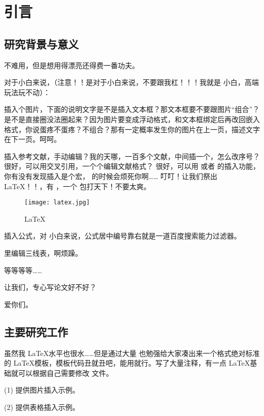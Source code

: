 \section{引言}
\subsection{研究背景与意义}

 不难用，但是想用得漂亮还得费一番功夫。

对于小白来说，（注意！！是对于小白来说，不要跟我杠！！！我就是  小白，高端玩法玩不动）：

插入个图片，下面的说明文字是不是插入文本框？那文本框要不要跟图片“组合”？是不是直接圈没法圈起来？因为图片要变成浮动格式，和文本框绑定后再改回嵌入格式，你说蛋疼不蛋疼？不组合？那有一定概率发生你的图片在上一页，描述文字在下一页。呵呵。

插入参考文献，手动编辑？我的天哪，一百多个文献，中间插一个，怎么改序号？
很好，可以用交叉引用，一个个编辑文献格式？
很好，可以用  或者  的插入功能，你有没有发现插入是个宏， 的时候会烦死你啊……
叮叮！让我们祭出 \LaTeX！！\cite{2013浅谈使用}，有 ，一个  包打天下！不要太爽。


\begin{figure}[hbt]
    \centering
    \texttt{[image: latex.jpg]}
    \caption{LaTeX}
    \label{F.latex}
\end{figure}

插入公式，对  小白来说，公式居中编号靠右就是一道百度搜索能力过滤器。

 里编辑三线表，啊烦躁。

等等等等……

让我们，专心写论文好不好？

爱你们。


\subsection{主要研究工作}
虽然我 \LaTeX 水平也很水……但是通过大量  也勉强给大家凑出来一个格式绝对标准的 \LaTeX 模板，模板代码丑就丑吧，能用就行。写了大量注释，有一点 \LaTeX 基础就可以根据自己需要修改  文件。

(1) 提供图片插入示例。

(2) 提供表格插入示例。

